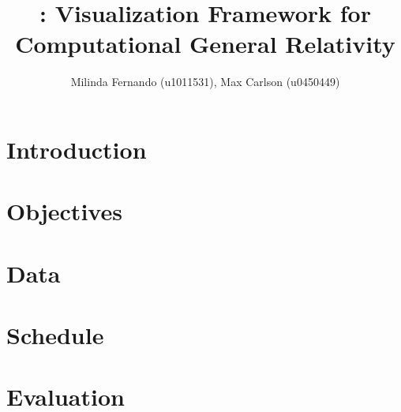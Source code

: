 \documentclass[a4paper,10pt]{article}
\title{\grvis : Visualization Framework for Computational General Relativity}
\author{Milinda Fernando (u1011531), Max Carlson (u0450449)}
\begin{document}
\maketitle

\section{Introduction}


\section{Objectives}


\section{Data}

\section{Schedule}


\section{Evaluation}


\end{document}
